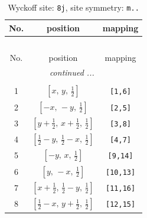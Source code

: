 \documentclass[fleqn,8pt]{jsarticle}
\begin{document}
\begin{longtable}{ccc}
\caption{Wyckoff site: {\tt 8j}, site symmetry: {\tt m..}}
 \\
 \hline \hline
No. & position & mapping \\ \hline \endfirsthead

\multicolumn{2}{l}{\tablename\ \thetable{}} \\
 \hline \hline
No. & position & mapping \\ \hline \endhead

 \hline \hline
\multicolumn{2}{r}{\footnotesize\it continued ...} \\ \endfoot

 \hline \hline
\multicolumn{2}{r}{} \\ \endlastfoot

1 & $\left[ x,\, y,\, \frac{1}{2} \right]$ & {\tt [1,6]} \\ \hline
2 & $\left[ - x,\, - y,\, \frac{1}{2} \right]$ & {\tt [2,5]} \\ \hline
3 & $\left[ y + \frac{1}{2},\, x + \frac{1}{2},\, \frac{1}{2} \right]$ & {\tt [3,8]} \\ \hline
4 & $\left[ \frac{1}{2} - y,\, \frac{1}{2} - x,\, \frac{1}{2} \right]$ & {\tt [4,7]} \\ \hline
5 & $\left[ - y,\, x,\, \frac{1}{2} \right]$ & {\tt [9,14]} \\ \hline
6 & $\left[ y,\, - x,\, \frac{1}{2} \right]$ & {\tt [10,13]} \\ \hline
7 & $\left[ x + \frac{1}{2},\, \frac{1}{2} - y,\, \frac{1}{2} \right]$ & {\tt [11,16]} \\ \hline
8 & $\left[ \frac{1}{2} - x,\, y + \frac{1}{2},\, \frac{1}{2} \right]$ & {\tt [12,15]} \\
\end{longtable}
\renewcommand{\arraystretch}{1.2}
\end{document}
